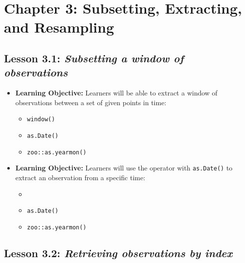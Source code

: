 \documentclass[
]{book}
\providecommand{\tightlist}{%
  \setlength{\itemsep}{0pt}\setlength{\parskip}{0pt}}
\begin{document}
\hypertarget{chapter-3-subsetting-extracting-and-resampling}{%
\section*{Chapter 3: Subsetting, Extracting, and Resampling}\label{chapter-3-subsetting-extracting-and-resampling}}

\hypertarget{lesson-3.1-subsetting-a-window-of-observations}{%
\subsection*{\texorpdfstring{Lesson 3.1: \emph{Subsetting a window of observations}}{Lesson 3.1: Subsetting a window of observations}}\label{lesson-3.1-subsetting-a-window-of-observations}}

\begin{itemize}
\tightlist
\item
  \textbf{Learning Objective:} Learners will be able to extract a window of observations between a set of given points in time:

  \begin{itemize}
  \tightlist
  \item
    \texttt{window()}
  \item
    \texttt{as.Date()}
  \item
    \texttt{zoo::as.yearmon()}
  \end{itemize}
\item
  \textbf{Learning Objective:} Learners will use the \texttt{\textquotesingle{}{[}\textquotesingle{}} operator with \texttt{as.Date()} to extract an observation from a specific time:

  \begin{itemize}
  \tightlist
  \item
    \texttt{\textquotesingle{}{[}\textquotesingle{}}
  \item
    \texttt{as.Date()}
  \item
    \texttt{zoo::as.yearmon()}
  \end{itemize}
\end{itemize}

\hypertarget{lesson-3.2-retrieving-observations-by-index}{%
\subsection*{\texorpdfstring{Lesson 3.2: \emph{Retrieving observations by index}}{Lesson 3.2: Retrieving observations by index}}\label{lesson-3.2-retrieving-observations-by-index}}
\end{document}
